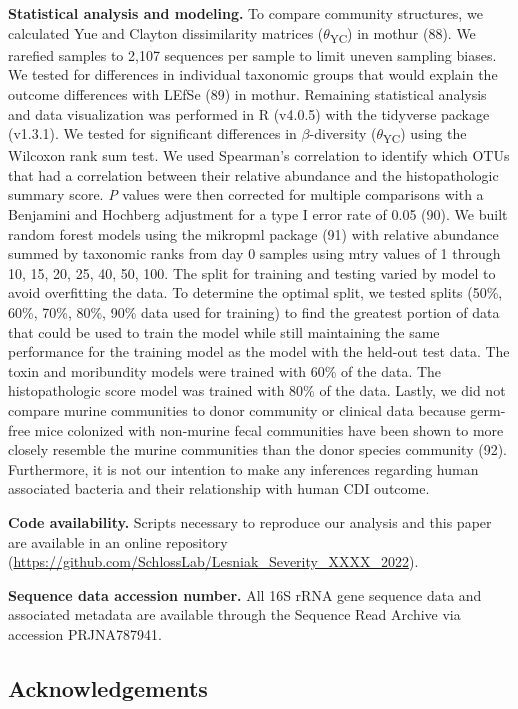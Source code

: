 \documentclass[
  12pt,
]{article}
\begin{document}
\textbf{Statistical analysis and modeling.} To compare community
structures, we calculated Yue and Clayton dissimilarity matrices
(\(\theta\)\textsubscript{YC}) in mothur (88). We rarefied samples to
2,107 sequences per sample to limit uneven sampling biases. We tested
for differences in individual taxonomic groups that would explain the
outcome differences with LEfSe (89) in mothur. Remaining statistical
analysis and data visualization was performed in R (v4.0.5) with the
tidyverse package (v1.3.1). We tested for significant differences in
\(\beta\)-diversity (\(\theta\)\textsubscript{YC}) using the Wilcoxon
rank sum test. We used Spearman's correlation to identify which OTUs
that had a correlation between their relative abundance and the
histopathologic summary score. \emph{P} values were then corrected for
multiple comparisons with a Benjamini and Hochberg adjustment for a type
I error rate of 0.05 (90). We built random forest models using the
mikropml package (91) with relative abundance summed by taxonomic ranks
from day 0 samples using mtry values of 1 through 10, 15, 20, 25, 40,
50, 100. The split for training and testing varied by model to avoid
overfitting the data. To determine the optimal split, we tested splits
(50\%, 60\%, 70\%, 80\%, 90\% data used for training) to find the
greatest portion of data that could be used to train the model while
still maintaining the same performance for the training model as the
model with the held-out test data. The toxin and moribundity models were
trained with 60\% of the data. The histopathologic score model was
trained with 80\% of the data. Lastly, we did not compare murine
communities to donor community or clinical data because germ-free mice
colonized with non-murine fecal communities have been shown to more
closely resemble the murine communities than the donor species community
(92). Furthermore, it is not our intention to make any inferences
regarding human associated bacteria and their relationship with human
CDI outcome.

\textbf{Code availability.} Scripts necessary to reproduce our analysis
and this paper are available in an online repository
(\url{https://github.com/SchlossLab/Lesniak_Severity_XXXX_2022}).

\textbf{Sequence data accession number.} All 16S rRNA gene sequence data
and associated metadata are available through the Sequence Read Archive
via accession PRJNA787941.

\hypertarget{acknowledgements}{%
\subsection{Acknowledgements}\label{acknowledgements}}
\end{document}
